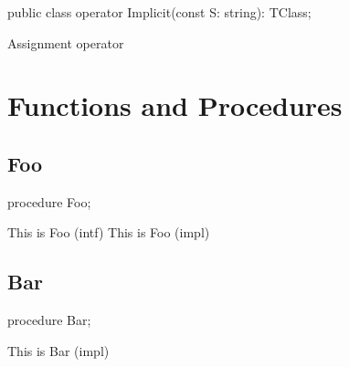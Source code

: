 \documentclass{report}
\begin{document}
\begin{list}{}{
\setlength{\itemindent}{0cm}
\setlength{\listparindent}{0cm}
\setlength{\leftmargin}{\evensidemargin}
\addtolength{\leftmargin}{\tmplength}
\settowidth{\labelsep}{X}
\addtolength{\leftmargin}{\labelsep}
\setlength{\labelwidth}{\tmplength}
}
\begin{flushleft}
\item[\textbf{Declaration}\hfill]
\begin{ttfamily}
public class operator Implicit(const S: string): TClass;\end{ttfamily}


\end{flushleft}
\par
\item[\textbf{Description}]
Assignment operator

\end{list}
\section{Functions and Procedures}
\subsection*{Foo}
\begin{list}{}{
\setlength{\itemindent}{0cm}
\setlength{\listparindent}{0cm}
\setlength{\leftmargin}{\evensidemargin}
\addtolength{\leftmargin}{\tmplength}
\settowidth{\labelsep}{X}
\addtolength{\leftmargin}{\labelsep}
\setlength{\labelwidth}{\tmplength}
}
\begin{flushleft}
\item[\textbf{Declaration}\hfill]
\begin{ttfamily}
procedure Foo;\end{ttfamily}


\end{flushleft}
\par
\item[\textbf{Description}]
This is Foo (intf) This is Foo (impl)

\end{list}
\subsection*{Bar}
\begin{list}{}{
\setlength{\itemindent}{0cm}
\setlength{\listparindent}{0cm}
\setlength{\leftmargin}{\evensidemargin}
\addtolength{\leftmargin}{\tmplength}
\settowidth{\labelsep}{X}
\addtolength{\leftmargin}{\labelsep}
\setlength{\labelwidth}{\tmplength}
}
\begin{flushleft}
\item[\textbf{Declaration}\hfill]
\begin{ttfamily}
procedure Bar;\end{ttfamily}


\end{flushleft}
\par
\item[\textbf{Description}]
This is Bar (impl)

\end{list}
\end{document}
